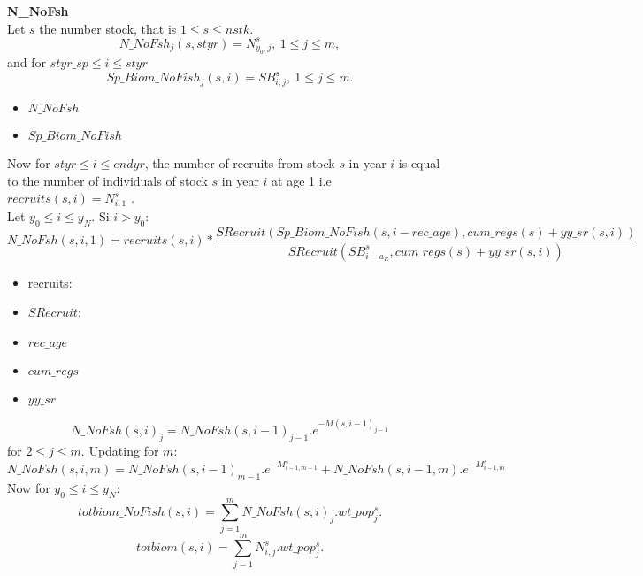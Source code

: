 \documentclass{article}
\begin{document}
\textbf{N\_NoFsh}\\
Let $s$ the number stock,  that is $1\leq s \leq nstk$.
\begin{equation}
N\_NoFsh_j(s,styr)=N^s_{y_0,j}, \ 1\leq j \leq m,
\end{equation}
and for $styr\_sp \leq i \leq styr$ 
\begin{equation}
    Sp\_Biom\_NoFish_j(s,i)=SB^s_{i,j}, \ 1\leq j \leq m.
\end{equation}
\begin{itemize}
    \item $N\_NoFsh$
    \item $Sp\_Biom\_NoFish$
    
\end{itemize}
Now for $styr\leq i \leq endyr$, the number of recruits from stock $s$ in year $i$ is equal to the number of individuals of stock $s$ in year $i$ at age 1 i.e $recruits(s,i)=N^s_{i,1}$ .\\ Let $y_0\leq i \leq y_N$.
Si $i>y_0$:
\begin{equation}
    N\_NoFsh(s,i,1)=recruits(s,i)*\dfrac{SRecruit(Sp\_Biom\_NoFish(s,i-rec\_age),cum\_regs(s)+yy\_sr(s,i))}{SRecruit(SB^s_{i-a_R},cum\_regs(s)+yy\_sr(s,i))}
\end{equation}
\begin{itemize}
    \item recruits:
    \item $SRecruit$:
    \item $rec\_age$
    \item $cum\_regs$
    \item $yy\_sr$
\end{itemize}
\begin{equation}
    N\_NoFsh(s,i)_j=N\_NoFsh(s,i-1)_{j-1}.e^{-M(s,i-1)_{j-1}}
\end{equation}
for $2\leq j \leq m.$ Updating for $m$:
\begin{equation}
    N\_NoFsh(s,i,m)=N\_NoFsh(s,i-1)_{m-1}.e^{-M^s_{i-1,m-1}}+N\_NoFsh(s,i-1,m).e^{-M^s_{i-1,m}}
\end{equation}
Now for $ y_0\leq i \leq y_N$:
\begin{equation}
    totbiom\_NoFish(s,i)=\sum_{j=1}^mN\_NoFsh(s,i)_j.wt\_pop^s_j.
\end{equation}
\begin{equation}
    totbiom(s,i)=\sum_{j=1}^mN^s_{i,j}.wt\_pop^s_j.
\end{equation}
\end{document}
